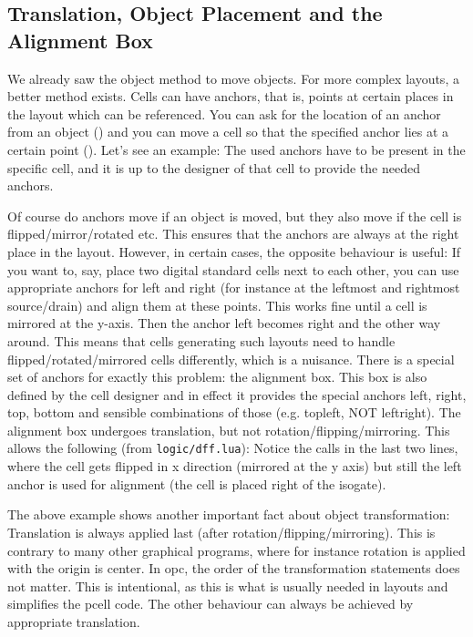 \subsection{Translation, Object Placement and the Alignment Box}
We already saw the  object method to move objects. For more complex layouts, a better method exists. Cells can have anchors, that is, points
at certain places in the layout which can be referenced. You can ask for the location of an anchor from an object () and you can move a
cell so that the specified anchor lies at a certain point (). Let's see an example:
The used anchors have to be present in the specific cell, and it is up to the designer of that cell to provide the needed anchors.

Of course do anchors move if an object is moved, but they also move if the cell is flipped/mirror/rotated etc. This ensures that the anchors are always at the
right place in the layout. However, in certain cases, the opposite behaviour is useful: If you want to, say, place two digital standard cells next to each other,
you can use appropriate anchors for left and right (for instance at the leftmost and rightmost source/drain) and align them at these points. This works fine
until a cell is mirrored at the y-axis. Then the anchor left becomes right and the other way around. This means that cells generating such layouts need to handle
flipped/rotated/mirrored cells differently, which is a nuisance. There is a special set of anchors for exactly this problem: the alignment box. This box is also
defined by the cell designer and in effect it provides the special anchors left, right, top, bottom and sensible combinations of those (e.g. topleft, NOT
leftright). The alignment box undergoes translation, but not rotation/flipping/mirroring. This allows the following (from \texttt{logic/dff.lua}):
Notice the calls in the last two lines, where the cell gets flipped in x direction (mirrored at the y axis) but still the left anchor is used for alignment (the
cell is placed right of the isogate).

The above example shows another important fact about object transformation: Translation is always applied last (after rotation/flipping/mirroring). This is
contrary to many other graphical programs, where for instance rotation is applied with the origin is center. In opc, the order of the transformation statements
does not matter. This is intentional, as this is what is usually needed in layouts and simplifies the pcell code. The other behaviour can always be achieved by
appropriate translation.

